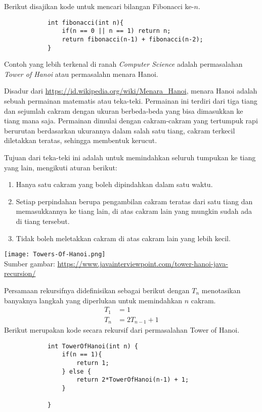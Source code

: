 \documentclass[11pt]{scrartcl}
\begin{document}
		    Berikut disajikan kode untuk mencari bilangan Fibonacci ke-$n$.
		    \begin{lstlisting}
		    int fibonacci(int n){
		    	if(n == 0 || n == 1) return n;
		    	return fibonacci(n-1) + fibonacci(n-2);
		    }
		    \end{lstlisting}
		    
		    Contoh yang lebih terkenal di ranah \textit{Computer Science} adalah permasalahan \textit{Tower of Hanoi} atau permasalahn menara Hanoi.
		    \begin{remark*} 
		    Disadur dari \url{https://id.wikipedia.org/wiki/Menara_Hanoi}, 
		    menara Hanoi adalah sebuah permainan matematis atau teka-teki. Permainan ini terdiri dari tiga tiang dan sejumlah cakram dengan ukuran berbeda-beda yang bisa dimasukkan ke tiang mana saja. Permainan dimulai dengan cakram-cakram yang tertumpuk rapi berurutan berdasarkan ukurannya dalam salah satu tiang, cakram terkecil diletakkan teratas, sehingga membentuk kerucut.
		    
		    Tujuan dari teka-teki ini adalah untuk memindahkan seluruh tumpukan ke tiang yang lain, mengikuti aturan berikut:
		    
		    \begin{enumerate}
		    \item Hanya satu cakram yang boleh dipindahkan dalam satu waktu.
		    	    \item Setiap perpindahan berupa pengambilan cakram teratas dari satu tiang dan memasukkannya ke tiang lain, di atas cakram lain yang mungkin sudah ada di tiang tersebut.
		    	    \item Tidak boleh meletakkan cakram di atas cakram lain yang lebih kecil.
		    \end{enumerate}
		    \texttt{[image: Towers-Of-Hanoi.png]}\\
		    Sumber gambar: \url{https://www.javainterviewpoint.com/tower-hanoi-java-recursion/}
		    \end{remark*}
		    Persamaan rekursifnya didefinisikan sebagai berikut dengan $T_n$ menotasikan banyaknya langkah yang diperlukan untuk memindahkan $n$ cakram.
		    \begin{align*}
		        T_1 &= 1 \\
		        T_n &= 2T_{n-1}+1
		    \end{align*}
		    Berikut merupakan kode secara rekursif dari permasalahan Tower of Hanoi.
		    \begin{lstlisting}
		    int TowerOfHanoi(int n) {
		    	if(n == 1){ 
		    		return 1;
		    	} else {
		    		return 2*TowerOfHanoi(n-1) + 1;
		    	}
		    	
		    }
		    \end{lstlisting}
		    
\end{document}
